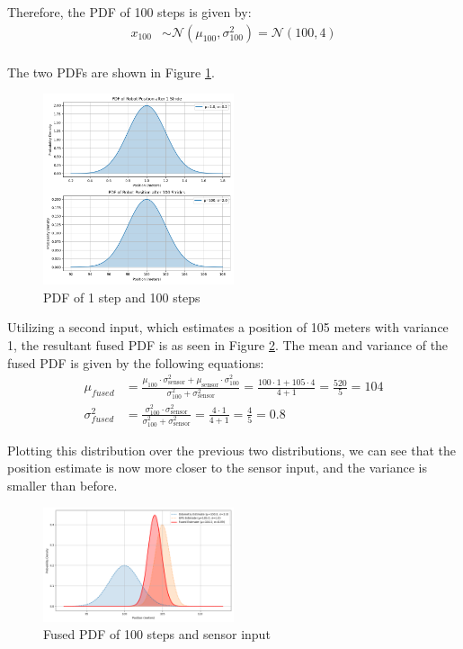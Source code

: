 \documentclass{article}
\begin{document}
Therefore, the PDF of 100 steps is given by:
\begin{align*}
    x_{100} &\sim \mathcal{N}(\mu_{100}, \sigma^2_{100}) = \mathcal{N}(100, 4) \\
\end{align*}

The two PDFs are shown in Figure \ref{fig:pdfs}.
\begin{figure}[ht!]
    \centering
    \includegraphics[width=0.5\textwidth]{pdf_plots.png}
    \caption{PDF of 1 step and 100 steps}
    \label{fig:pdfs}
\end{figure}

Utilizing a second input, which estimates a position of 105 meters with variance 1, the resultant fused PDF is as seen in Figure \ref{fig:pdfs_fused}. The mean and variance of the fused PDF is given by the following equations:
\begin{align*}
    \mu_{fused} &= \frac{\mu_{100}\cdot \sigma^2_{\text{sensor}} + \mu_{\text{sensor}} \cdot \sigma^2_{100}}{\sigma^2_{100} + \sigma^2_{\text{sensor}}} = \frac{100 \cdot 1 + 105 \cdot 4}{4 + 1} = \frac{520}{5} = 104 \\
    \sigma^2_{fused} &= \frac{\sigma^2_{100} \cdot \sigma^2_{\text{sensor}}}{\sigma^2_{100} + \sigma^2_{\text{sensor}}} = \frac{4 \cdot 1}{4 + 1} = \frac{4}{5} = 0.8
\end{align*}

Plotting this distribution over the previous two distributions, we can see that the position estimate is now more closer to the sensor input, and the variance is smaller than before. 
\begin{figure}[ht!]
    \centering
    \includegraphics[width=0.5\textwidth]{fused_estimate_plot.png}
    \caption{Fused PDF of 100 steps and sensor input}
    \label{fig:pdfs_fused}
\end{figure}

\end{document}
